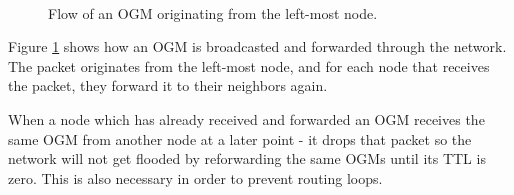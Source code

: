 \begin{figure}[h]
	\centering
	\\
	\caption{Flow of an \acf{OGM} originating from the left-most node.}
	\label{fig:ogm_packet_flow}
\end{figure}

Figure \ref{fig:ogm_packet_flow} shows how an \ac{OGM} is broadcasted and
forwarded through the network. The packet originates from the left-most node,
and for each node that receives the packet, they forward it to their neighbors
again.

When a node which has already received and forwarded an \ac{OGM} receives the
same \ac{OGM} from another node at a later point - it drops that packet so the
network will not get flooded by reforwarding the same \acp{OGM} until its
\ac{TTL} is zero. This is also necessary in order to prevent routing loops.

